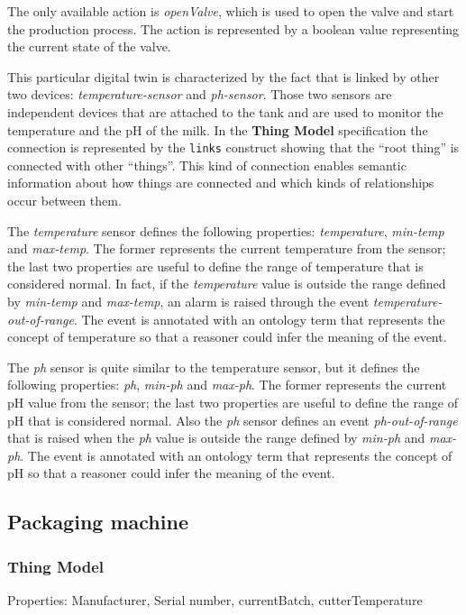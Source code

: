 The only available action is \textit{openValve}, which is used to open the valve and start the production process. The action is represented by a boolean value representing the current state of the valve.

This particular digital twin is characterized by the fact that is linked by other two devices: \textit{temperature-sensor} and \textit{ph-sensor}.
Those two sensors are independent devices that are attached to the tank and are used to monitor the temperature and the pH of the milk.
In the \textbf{Thing Model} specification the connection is represented by the \texttt{links} construct showing that the ``root thing'' is connected
with other ``things''.
This kind of connection enables semantic information about how things are connected and which kinds of relationships occur between them.

The \textit{temperature} sensor defines the following properties: \textit{temperature}, \textit{min-temp} and \textit{max-temp}. The former represents the current temperature from the sensor; the last two properties are useful to define the range of temperature that is considered normal.
In fact, if the \textit{temperature} value is outside the range defined by \textit{min-temp} and \textit{max-temp}, an alarm is raised through the event \textit{temperature-out-of-range}. The event is annotated with an ontology term that represents the concept of temperature so that a reasoner
could infer the meaning of the event.

The \textit{ph} sensor is quite similar to the temperature sensor, but it defines the following properties: \textit{ph}, \textit{min-ph} and \textit{max-ph}. The former represents the current pH value from the sensor; the last two properties are useful to define the range of pH that is considered normal. Also the \textit{ph} sensor defines an event \textit{ph-out-of-range} that is raised when the \textit{ph} value is outside the range defined by \textit{min-ph} and \textit{max-ph}.
The event is annotated with an ontology term that represents the concept of pH so that a reasoner could infer the meaning of the event.

\subsection{Packaging machine}
\subsubsection{Thing Model}
Properties: Manufacturer, Serial number, currentBatch, cutterTemperature

